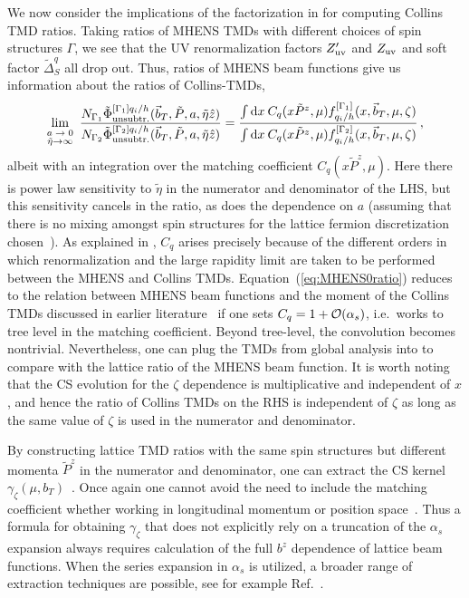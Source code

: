 \documentclass[11pt,a4paper]{article}
\newcommand{\df}{\mathrm{d}}
\newcommand{\bt}{\vec b_T}
\newcommand{\q}{q_i}
\begin{document}
We now consider the implications of the factorization in  for computing Collins TMD ratios.  Taking ratios of MHENS TMDs with different choices of spin structures $\Gamma$,  we see that the UV renormalization factors $Z'_{\rm uv}$ and $Z_{\rm uv}$ and soft factor $\tilde \Delta_S^q$ all drop out. Thus, ratios of MHENS beam functions give us information about the ratios of Collins-TMDs,   
\begin{align} \label{eq:MHENS0ratio}
  \lim_{\stackrel{\text{\scriptsize $a\to 0$}}{\tilde\eta\to \infty}} \ 
 \frac{ N_{\Gamma_1} \tilde \Phi_{\rm unsubtr.}^{[\Gamma_1]\q/h}(\bt,\tilde P,a,\tilde\eta\hat z) }{ N_{\Gamma_2} \tilde \Phi_{\rm unsubtr.}^{[\Gamma_2]\q/h}(\bt,\tilde P,a,\tilde\eta\hat z) }
  = \frac{ \int\df x\: C_q(x\tilde P^z,\mu) f_{\q/h}^{[\Gamma_1]}(x,\bt,\mu,\zeta) }{ \int\df x\: C_q(x\tilde P^z,\mu) f_{\q/h}^{[\Gamma_2]}(x,\bt,\mu,\zeta) }
  \,,
\end{align}  
albeit with an integration over the matching coefficient $C_q(x\tilde P^z,\mu)$.
Here there is power law sensitivity to $\tilde \eta$ in the numerator and denominator of the LHS, but this sensitivity cancels in the ratio, as does the dependence on $a$ (assuming that there is no mixing amongst spin structures for the lattice fermion discretization chosen~\cite{Constantinou:2019vyb,Shanahan:2019zcq,Green:2020xco,Ji:2021uvr}). 
As explained in \sec{qcs},  $C_q$ arises precisely because of the different orders in which renormalization and the large rapidity limit are taken to be performed between the MHENS and Collins TMDs.  
Equation~(\ref{eq:MHENS0ratio}) reduces to the relation between MHENS beam functions and the moment of the Collins TMDs discussed in earlier literature~\cite{Musch:2010ka,Musch:2011er,Engelhardt:2015xja,Yoon:2016dyh,Yoon:2017qzo} if one sets $C_q=1 +{\cal O}(\alpha_s)$, i.e.~works to tree level in the matching coefficient.
Beyond tree-level, the convolution becomes nontrivial. Nevertheless, one can plug the TMDs from global analysis into \eq{MHENS0ratio} to compare with the lattice ratio of the MHENS beam function.  
It is worth noting that the CS evolution for the $\zeta$ dependence is multiplicative and independent of $x$, and hence the ratio of Collins TMDs on the RHS is independent of $\zeta$ as long as the same value of $\zeta$ is used in the numerator and denominator.  

By constructing lattice TMD ratios with the same spin structures but different momenta $\tilde P^z$ in the numerator and denominator, one can extract the CS kernel $\gamma_\zeta(\mu,b_T)$~\cite{Ebert:2018gzl}. Once again one cannot avoid the need to include the matching coefficient whether working in longitudinal momentum or position space~\cite{Ebert:2019tvc}.  Thus a formula for obtaining $\gamma_\zeta$ that does not explicitly rely on a truncation of the $\alpha_s$ expansion always requires calculation of the full $b^z$ dependence of lattice beam functions. When the series expansion in $\alpha_s$ is utilized, a broader range of extraction techniques are possible, see for example Ref.~\cite{Schlemmer:2021aij}.
 
\end{document}
